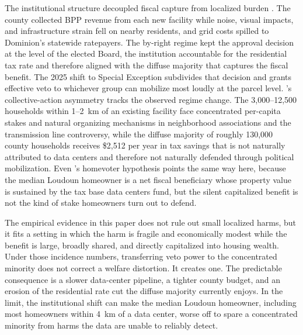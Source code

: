 \documentclass[12pt]{article}
\begin{document}
\begin{center}

\end{center}

\label{sec:legal}

The institutional structure decoupled fiscal capture from localized burden \citep{CalabresiMelamed1972}. The county collected BPP revenue from each new facility while noise, visual impacts, and infrastructure strain fell on nearby residents, and grid costs spilled to Dominion's statewide ratepayers. The by-right regime kept the approval decision at the level of the elected Board, the institution accountable for the residential tax rate and therefore aligned with the diffuse majority that captures the fiscal benefit. The 2025 shift to Special Exception subdivides that decision and grants effective veto to whichever group can mobilize most loudly at the parcel level. \citet{Olson1965}'s collective-action asymmetry tracks the observed regime change. The 3,000--12,500 households within 1--2~km of an existing facility face concentrated per-capita stakes and natural organizing mechanisms in neighborhood associations and the transmission line controversy, while the diffuse majority of roughly 130,000 county households receives \$2,512 per year in tax savings that is not naturally attributed to data centers and therefore not naturally defended through political mobilization. Even \citet{Fischel2001}'s homevoter hypothesis points the same way here, because the median Loudoun homeowner is a net fiscal beneficiary whose property value is sustained by the tax base data centers fund, but the silent capitalized benefit is not the kind of stake homeowners turn out to defend.

The empirical evidence in this paper does not rule out small localized harms, but it fits a setting in which the harm is fragile and economically modest while the benefit is large, broadly shared, and directly capitalized into housing wealth. Under those incidence numbers, transferring veto power to the concentrated minority does not correct a welfare distortion. It creates one. The predictable consequence is a slower data-center pipeline, a tighter county budget, and an erosion of the residential rate cut the diffuse majority currently enjoys. In the limit, the institutional shift can make the median Loudoun homeowner, including most homeowners within 4~km of a data center, worse off to spare a concentrated minority from harms the data are unable to reliably detect.

\end{document}
